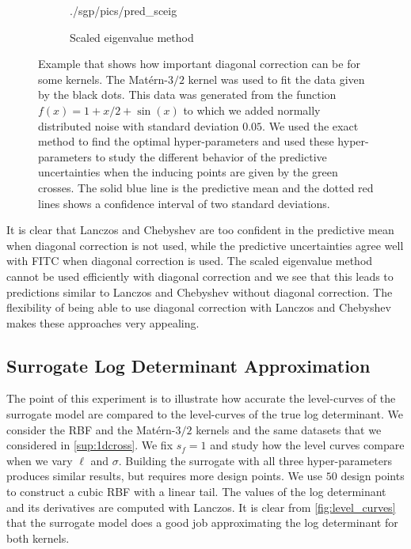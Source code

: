 \begin{figure}[htp]
\begin{center}
\begin{subfigure}{0.46\textwidth}
      {./sgp/pics/pred_sceig}
      \caption{Scaled eigenvalue method}
      \label{fig:pred_sceig}
    \end{subfigure}
    \caption{Example that shows how important diagonal correction can be for
    some kernels. The Mat\'ern\hyp{}$3/2$ kernel was used to fit the data given
    by the black dots. This data was generated from the function $f(x) = 1 + x/2
    + \sin(x)$ to which we added normally distributed noise with standard
    deviation $0.05$. We used the exact method to find the optimal
    hyper\hyp{}parameters and used these hyper\hyp{}parameters to study the
    different behavior of the predictive uncertainties when the inducing points
    are given by the green crosses. The solid blue line is the predictive mean
    and the dotted red lines shows a confidence interval of two standard
    deviations.}\label{fig:diag_correction}
  \end{center}
\end{figure}

It is clear that Lanczos and Chebyshev are too confident in the predictive mean
when diagonal correction is not used, while the predictive uncertainties agree
well with FITC when diagonal correction is used. The scaled eigenvalue method
cannot be used efficiently with diagonal correction and we see that this leads
to predictions similar to Lanczos and Chebyshev without diagonal correction. The
flexibility of being able to use diagonal correction with Lanczos and Chebyshev
makes these approaches very appealing.

\subsection{Surrogate Log Determinant Approximation}
\label{sup:surrlogdetapprox}

The point of this experiment is to illustrate how accurate the level\hyp{}curves
of the surrogate model are compared to the level\hyp{}curves of the true log
determinant. We consider the RBF and the Mat\'ern\hyp{}$3/2$ kernels and the
same datasets that we considered in \ref{sup:1dcross}. We fix $s_f=1$ and study
how the level curves compare when we vary $\ell$ and $\sigma$. Building the
surrogate with all three hyper\hyp{}parameters produces similar results, but
requires more design points. We use $50$ design points to construct a cubic RBF
with a linear tail. The values of the log determinant and its derivatives
are computed with Lanczos. It is clear from \cref{fig:level_curves} that the
surrogate model does a good job approximating the log determinant for both
kernels.

